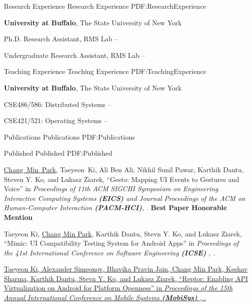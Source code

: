 \documentclass[letterpaper,MMMyyyy,nonstopmode]{simpleresumecv}
\begin{document}
\begin{Body}
\Section
{Research Experience}
{Research Experience}
{PDF:ResearchExperience}

\Entry
\textbf{University at Buffalo}, The State University of New York

\Gap
\BulletItem
Ph.D. Research Assistant, RMS Lab
\hfill
{} --

\Gap
\BulletItem
Undergraduate Research Assistant, RMS Lab
\hfill
{} --



\Section
{Teaching Experience}
{Teaching Experience}
{PDF:TeachingExperience}

\Entry
\textbf{University at Buffalo}, The State University of New York

\Gap
\BulletItem
CSE486/586: Distributed Systems
\hfill
{} --

\Gap
\BulletItem
CSE421/521: Operating Systems
\hfill
{} --




\Section
{Publications}
{Publications}
{PDF:Publications}

\SubSection
{Published}
{Published}
{PDF:Published}

\begingroup
\renewcommand{\MaxNumberedItem}{[88]}

\BigGap
\NumberedItem{[1]} 
\underline{Chang~Min~Park}, Taeyeon~Ki, Ali Ben Ali, 
Nikhil Sunil Pawar, Karthik Dantu, Steven Y. Ko, and Lukasz Ziarek, 
``Gesto: Mapping UI Events to Gestures and Voice'' in
\textit{Proceedings of 11th ACM SIGCHI Symposium on Engineering Interactive Computing Systems \textbf{(EICS)}
and \textit{Journal Proceedings of the ACM on Human-Computer Interaction \textbf{(PACM-HCI)}}, .}
\linebreak\textbf{Best Paper Honorable Mention}

\Gap
\NumberedItem{[2]}
Taeyeon Ki, \underline{Chang Min Park}, Karthik Dantu, Stevn Y. Ko, and Lukasz Ziarek, 
``Mimic: UI Compatibility Testing System for Android Apps'' in
\textit{Proceedings of the 41st International Conference on Software Engineering \textbf{(ICSE)}
, .}

\Gap
\NumberedItem{[3]}
\href{https://dl.acm.org/citation.cfm?id=3081341}
{Taeyeon Ki, Alexander Simeonov, Bhavika Pravin Jain, \underline{Chang Min Park},
Keshav Sharma, Karthik Dantu, Stevn Y. Ko, and Lukasz Ziarek, 
``Reptor: Enabling API Virtualization on Android for Platform Openness'' in 
\textit{Proceedings of the 15th Annual International Conference on Mobile Systems \textbf{(MobiSys)}
, }.}




\end{Body}
\end{document}
